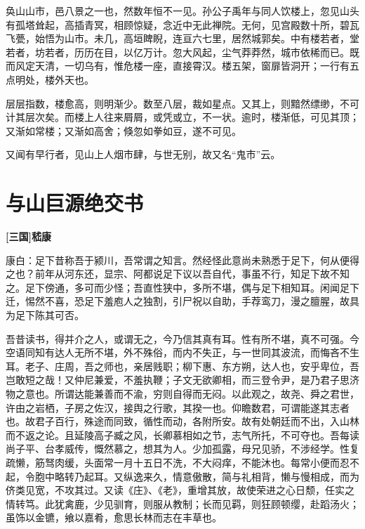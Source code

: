 \documentclass[UTF8,titlepage,oneside]{ctexbook}
\begin{document}
奂山山市，邑八景之一也，然数年恒不一见。孙公子禹年与同人饮楼上，忽见山头有孤塔耸起，高插青冥，相顾惊疑，念近中无此禅院。无何，见宫殿数十所，碧瓦飞甍，始悟为山市。未几，高垣睥睨，连亘六七里，居然城郭矣。中有楼若者，堂若者，坊若者，历历在目，以亿万计。忽大风起，尘气莽莽然，城市依稀而已。既而风定天清，一切乌有，惟危楼一座，直接霄汉。楼五架，窗扉皆洞开；一行有五点明处，楼外天也。


层层指数，楼愈高，则明渐少。数至八层，裁如星点。又其上，则黯然缥缈，不可计其层次矣。而楼上人往来屑屑，或凭或立，不一状。逾时，楼渐低，可见其顶；又渐如常楼；又渐如高舍；倏忽如拳如豆，遂不可见。


又闻有早行者，见山上人烟市肆，与世无别，故又名“鬼市”云。



\chapter*{与山巨源绝交书}
\begin{center}
	\textbf{[三国]嵇康}
\end{center}


康白：足下昔称吾于颍川，吾常谓之知言。然经怪此意尚未熟悉于足下，何从便得之也？前年从河东还，显宗、阿都说足下议以吾自代，事虽不行，知足下故不知之。足下傍通，多可而少怪；吾直性狭中，多所不堪，偶与足下相知耳。闲闻足下迁，惕然不喜，恐足下羞庖人之独割，引尸祝以自助，手荐鸾刀，漫之膻腥，故具为足下陈其可否。


吾昔读书，得并介之人，或谓无之，今乃信其真有耳。性有所不堪，真不可强。今空语同知有达人无所不堪，外不殊俗，而内不失正，与一世同其波流，而悔吝不生耳。老子、庄周，吾之师也，亲居贱职；柳下惠、东方朔，达人也，安乎卑位，吾岂敢短之哉！又仲尼兼爱，不羞执鞭；子文无欲卿相，而三登令尹，是乃君子思济物之意也。所谓达能兼善而不渝，穷则自得而无闷。以此观之，故尧、舜之君世，许由之岩栖，子房之佐汉，接舆之行歌，其揆一也。仰瞻数君，可谓能遂其志者也。故君子百行，殊途而同致，循性而动，各附所安。故有处朝廷而不出，入山林而不返之论。且延陵高子臧之风，长卿慕相如之节，志气所托，不可夺也。吾每读尚子平、台孝威传，慨然慕之，想其为人。少加孤露，母兄见骄，不涉经学。性复疏懒，筋驽肉缓，头面常一月十五日不洗，不大闷痒，不能沐也。每常小便而忍不起，令胞中略转乃起耳。又纵逸来久，情意傲散，简与礼相背，懒与慢相成，而为侪类见宽，不攻其过。又读《庄》、《老》，重增其放，故使荣进之心日颓，任实之情转笃。此犹禽鹿，少见驯育，则服从教制；长而见羁，则狂顾顿缨，赴蹈汤火；虽饰以金镳，飨以嘉肴，愈思长林而志在丰草也。
\end{document}
